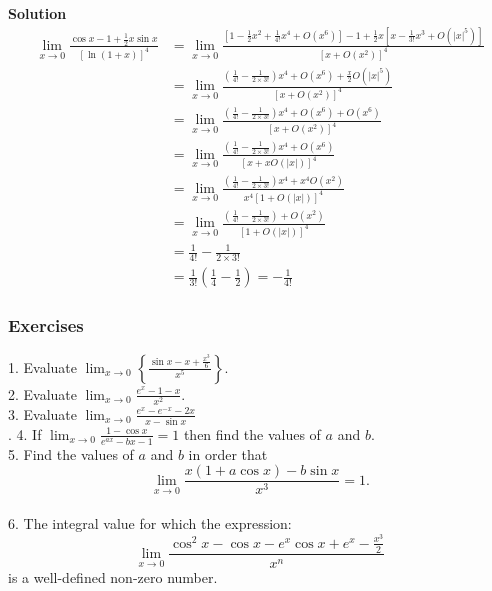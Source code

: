 \begin{enumerate}
\textbf{Solution}
$$
\begin{aligned}
\lim _{x \rightarrow 0} \frac{\cos x-1+\frac{1}{2} x \sin x}{[\ln (1+x)]^4} & =\lim _{x \rightarrow 0} \frac{\left[1-\frac{1}{2} x^2+\frac{1}{4 !} x^4+O\left(x^6\right)\right]-1+\frac{1}{2} x\left[x-\frac{1}{3 !} x^3+O\left(|x|^5\right)\right]}{\left[x+O\left(x^2\right)\right]^4} \\
& =\lim _{x \rightarrow 0} \frac{\left(\frac{1}{4 !}-\frac{1}{2 \times 3 !}\right) x^4+O\left(x^6\right)+\frac{x}{2} O\left(|x|^5\right)}{\left[x+O\left(x^2\right)\right]^4} \\
& =\lim _{x \rightarrow 0} \frac{\left(\frac{1}{4 !}-\frac{1}{2 \times 3 !}\right) x^4+O\left(x^6\right)+O\left(x^6\right)}{\left[x+O\left(x^2\right)\right]^4} \\
& =\lim _{x \rightarrow 0} \frac{\left(\frac{1}{4 !}-\frac{1}{2 \times 3 !}\right) x^4+O\left(x^6\right)}{[x+x O(|x|)]^4} \\
& =\lim _{x \rightarrow 0} \frac{\left(\frac{1}{4 !}-\frac{1}{2 \times 3 !}\right) x^4+x^4 O\left(x^2\right)}{x^4[1+O(|x|)]^4}  \\
& =\lim _{x \rightarrow 0} \frac{\left(\frac{1}{4 !}-\frac{1}{2 \times 3 !}\right)+O\left(x^2\right)}{[1+O(|x|)]^4} \\
& =\frac{1}{4 !}-\frac{1}{2 \times 3 !}  \\
& =\frac{1}{3 !}\left(\frac{1}{4}-\frac{1}{2}\right)=-\frac{1}{4 !} \quad
\end{aligned}
$$
\end{enumerate}


\subsubsection{Exercises}

1. Evaluate $\lim _{x \rightarrow 0}\left\{\frac{\sin x-x+\frac{x^3}{6}}{x^5}\right\}$.\\
2. Evaluate $\lim _{x \rightarrow 0} \frac{e^x-1-x}{x^2}$.\\
3. Evaluate $\lim _{x \rightarrow 0} \frac{e^x-e^{-x}-2 x}{x-\sin x}$\\.
4. If $\lim _{x \rightarrow 0} \frac{1-\cos x}{e^{a x}-b x-1}=1$ then find the values of $a$ and $b$.\\
5. Find the values of $a$ and $b$ in order that
$$
\lim _{x \rightarrow 0} \frac{x(1+a \cos x)-b \sin x}{x^3}=1 .
$$ \\

6. The integral value for which the expression:
$$\lim_{x\to 0} \frac{\cos^2x-\cos x - e^x \cos x + e^x -\frac{x^3}{2}}{x^n}$$
is a well-defined non-zero number.\\

